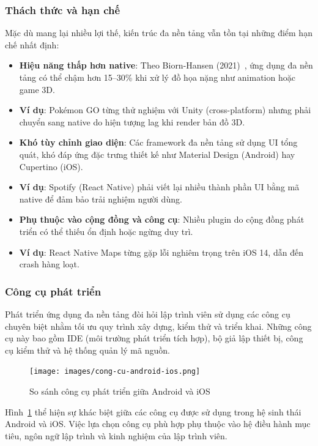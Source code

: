 \subsubsection{Thách thức và hạn chế}
\begin{flushleft}
    \hspace*{0.8cm}Mặc dù mang lại nhiều lợi thế, kiến trúc đa nền tảng vẫn tồn tại những điểm hạn chế nhất định:
    \setlength{\leftmargini}{1.5cm}
    \begin{itemize}
        \item \textbf{Hiệu năng thấp hơn native}: Theo Biorn-Hansen (2021)~\cite{biornhansen2021}, ứng dụng đa nền tảng có thể chậm hơn 15–30\% khi xử lý đồ họa nặng như animation hoặc game 3D.
        \item \textbf{Ví dụ}: Pokémon GO từng thử nghiệm với Unity (cross-platform) nhưng phải chuyển sang native do hiện tượng lag khi render bản đồ 3D.
        \item \textbf{Khó tùy chỉnh giao diện}: Các framework đa nền tảng sử dụng UI tổng quát, khó đáp ứng đặc trưng thiết kế như Material Design (Android) hay Cupertino (iOS).
        \item \textbf{Ví dụ}: Spotify (React Native) phải viết lại nhiều thành phần UI bằng mã native để đảm bảo trải nghiệm người dùng.
        \item \textbf{Phụ thuộc vào cộng đồng và công cụ}: Nhiều plugin do cộng đồng phát triển có thể thiếu ổn định hoặc ngừng duy trì.
        \item \textbf{Ví dụ}: React Native Maps từng gặp lỗi nghiêm trọng trên iOS 14, dẫn đến crash hàng loạt.
    \end{itemize}
\end{flushleft}

\subsubsection{Công cụ phát triển}
\begin{flushleft}
  \hspace*{0.8cm}Phát triển ứng dụng đa nền tảng đòi hỏi lập trình viên sử dụng các công cụ chuyên biệt nhằm tối ưu quy trình xây dựng, kiểm thử và triển khai. Những công cụ này bao gồm IDE (môi trường phát triển tích hợp), bộ giả lập thiết bị, công cụ kiểm thử và hệ thống quản lý mã nguồn.

  \begin{figure}[H]
    \centering
    \texttt{[image: images/cong-cu-android-ios.png]}
    \caption{So sánh công cụ phát triển giữa Android và iOS}
    \label{fig:android_ios_tools}
  \end{figure}

  \hspace*{0.8cm}Hình~\ref{fig:android_ios_tools} thể hiện sự khác biệt giữa các công cụ được sử dụng trong hệ sinh thái Android và iOS. Việc lựa chọn công cụ phù hợp phụ thuộc vào hệ điều hành mục tiêu, ngôn ngữ lập trình và kinh nghiệm của lập trình viên.
\end{flushleft}


